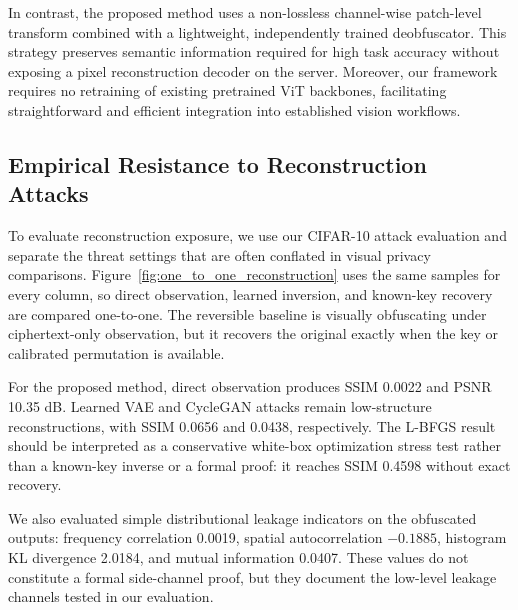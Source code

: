 \documentclass{ieeeaccess}
\newcommand{\rev}[1]{{\color{black}#1}}
\begin{document}
\rev{In contrast, the proposed method uses a non-lossless channel-wise patch-level transform combined with a lightweight, independently trained deobfuscator. This strategy preserves semantic information required for high task accuracy without exposing a pixel reconstruction decoder on the server. Moreover, our framework requires no retraining of existing pretrained ViT backbones, facilitating straightforward and efficient integration into established vision workflows.}

\subsection{\rev{Empirical Resistance to Reconstruction Attacks}}



\rev{To evaluate reconstruction exposure, we use our CIFAR-10 attack evaluation and separate the threat settings that are often conflated in visual privacy comparisons. Figure~\ref{fig:one_to_one_reconstruction} uses the same samples for every column, so direct observation, learned inversion, and known-key recovery are compared one-to-one. The reversible baseline is visually obfuscating under ciphertext-only observation, but it recovers the original exactly when the key or calibrated permutation is available.}

\rev{For the proposed method, direct observation produces SSIM 0.0022 and PSNR 10.35 dB. Learned VAE and CycleGAN attacks remain low-structure reconstructions, with SSIM 0.0656 and 0.0438, respectively. The L-BFGS result should be interpreted as a conservative white-box optimization stress test rather than a known-key inverse or a formal proof: it reaches SSIM 0.4598 without exact recovery.}

\rev{We also evaluated simple distributional leakage indicators on the obfuscated outputs: frequency correlation 0.0019, spatial autocorrelation $-0.1885$, histogram KL divergence 2.0184, and mutual information 0.0407. These values do not constitute a formal side-channel proof, but they document the low-level leakage channels tested in our evaluation.}
\end{document}
